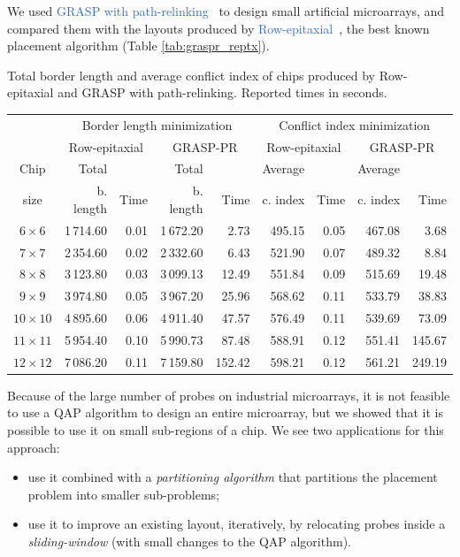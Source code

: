 \documentclass[portrait]{a0poster}
\begin{document}
\begin{multicols}{3}[\aggiheader]
\noindent We used \textcolor{highlight}{GRASP with path-relinking}~\cite{OLIVEIRA04}
to design small artificial microarrays, and compared them with the layouts
produced by \textcolor{highlight}{Row-epitaxial}~\cite{KAHNG03}, the best known
placement algorithm (Table \ref{tab:graspr_reptx}).

\begin{mytable}
\vspace*{2ex}
\caption{Total border length and average conflict index of chips produced by
Row-epitaxial and GRASP with path-relinking. Reported times in seconds.
\label{tab:graspr_reptx}}
\small{
\begin{tabular}{c||rr|rr||rr|rr|}
     & \multicolumn{4}{|c||}{Border length minimization} & \multicolumn{4}{c|}{Conflict index minimization}                                      \\ \cline{2-9}
     & \multicolumn{2}{|c|}{Row-epitaxial} & \multicolumn{2}{c||}{GRASP-PR} & \multicolumn{2}{c|}{Row-epitaxial} & \multicolumn{2}{c|}{GRASP-PR} \\ \cline{2-9}
Chip & Total     &      & Total     &      & Average  &      & Average  &      \\
size & b. length & Time & b. length & Time & c. index & Time & c. index & Time \\ \hline
$6\times 6$   & 1\,714.60 & 0.01 & 1\,672.20 &   2.73 & 495.15 & 0.05 & 467.08 &   3.68 \\
$7\times 7$   & 2\,354.60 & 0.02 & 2\,332.60 &   6.43 & 521.90 & 0.07 & 489.32 &   8.84 \\
$8\times 8$   & 3\,123.80 & 0.03 & 3\,099.13 &  12.49 & 551.84 & 0.09 & 515.69 &  19.48 \\
$9\times 9$   & 3\,974.80 & 0.05 & 3\,967.20 &  25.96 & 568.62 & 0.11 & 533.79 &  38.83 \\
$10\times 10$ & 4\,895.60 & 0.06 & 4\,911.40 &  47.57 & 576.49 & 0.11 & 539.69 &  73.09 \\
$11\times 11$ & 5\,954.40 & 0.10 & 5\,990.73 &  87.48 & 588.91 & 0.12 & 551.41 & 145.67 \\
$12\times 12$ & 7\,086.20 & 0.11 & 7\,159.80 & 152.42 & 598.21 & 0.12 & 561.21 & 249.19 \\ \hline
\end{tabular}}
\vspace*{4ex}
\end{mytable}

\noindent Because of the large number of probes on industrial microarrays, it is
not feasible to use a QAP algorithm to design an entire microarray, but we
showed that it is possible to use it on small sub-regions of a chip. We see two
applications for this approach:
\begin{itemize}
\item[1)] use it combined with a \emph{partitioning algorithm} that partitions
the placement problem into smaller sub-problems;
\item[2)] use it to improve an existing layout, iteratively, by relocating
probes inside a \emph{sliding-window} (with small changes to the QAP algorithm).
\end{itemize}


\end{multicols}
\end{document}

